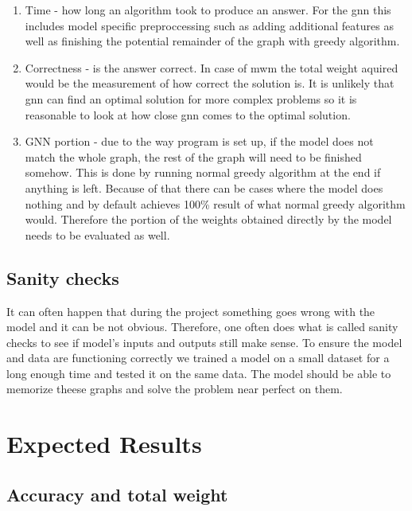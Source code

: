 \begin{enumerate}
\item Time - how long an algorithm took to produce an answer. For the \gls{gnn} this includes model specific preproccessing such as adding additional features as well as finishing the potential remainder of the graph with greedy algorithm.
\item Correctness - is the answer correct. In case of \gls{mwm} the total weight aquired would be the measurement of how correct the solution is. It is unlikely that \gls{gnn} can find an optimal solution for more complex problems so it is reasonable to look at how close \gls{gnn} comes to the optimal solution.
\item GNN portion - due to the way program is set up, if the model does not match the whole graph, the rest of the graph will need to be finished somehow. This is done by running normal greedy algorithm at the end if anything is left. Because of that there can be cases where the model does nothing and by default achieves 100\% result of what normal greedy algorithm would. Therefore the portion of the weights obtained directly by the model needs to be evaluated as well.
\end{enumerate}

\subsection{Sanity checks}

It can often happen that during the project something goes wrong with the model and it can be not obvious. Therefore, one often does what is called sanity checks to see if model's inputs and outputs still make sense. To ensure the model and data are functioning correctly we trained a model on a small dataset for a long enough time and tested it on the same data. The model should be able to memorize theese graphs and solve the problem near perfect on them.

\section{Expected Results}

\subsection{Accuracy and total weight}

